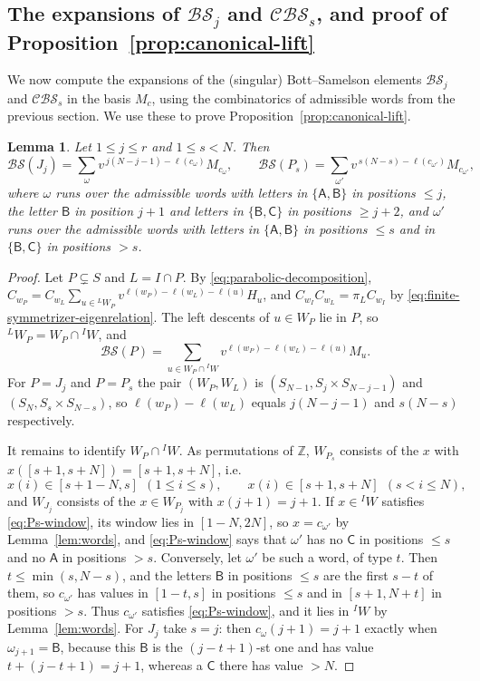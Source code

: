 \documentclass[11pt,a4paper,reqno]{amsart}
\numberwithin{equation}{section}
\newtheorem{lemma}[theorem]{Lemma}
\theoremstyle{definition}
\theoremstyle{remark}
\theoremstyle{plain}
\newcommand{\A}{\mathsf A}
\newcommand{\B}{\mathsf B}
\newcommand{\CC}{\mathsf C}
\newcommand{\D}{\mathcal {BS}}
\newcommand{\R}{\mathcal {BS}}
\newcommand{\V}{\mathcal {CBS}}
\begin{document}
\subsection{The expansions of $\R_j$ and $\V_s$, and proof of Proposition~\ref{prop:canonical-lift}}\label{sec:lowest-table}
 We now compute the expansions of the (singular) Bott--Samelson elements 
$\R_j$ and $\V_s$ in the basis $M_c$, using the combinatorics of admissible   words from the previous section. We   use these to prove Proposition~\ref{prop:canonical-lift}.
\begin{lemma}\label{lem:initial-supports}
Let $1\leq j\leq r$ and $1\leq s<N$. Then
\begin{equation}\label{eq:initial-expansions}
 \D(J_j)=\sum_{\omega}v^{\,j(N-j-1)-\ell(c_\omega)}M_{c_\omega},\qquad
 \D(P_s)=\sum_{\omega'}v^{\,s(N-s)-\ell(c_{\omega'})}M_{c_{\omega'}},
\end{equation}
where $\omega$ runs over the admissible words with letters in $\{\A,\B\}$ in positions $\leq j$, the letter $\B$ in
position $j+1$ and letters in $\{\B,\CC\}$ in positions $\geq j+2$, and $\omega'$ runs over the admissible words with
letters in $\{\A,\B\}$ in positions $\leq s$ and in $\{\B,\CC\}$ in positions $>s$.
\end{lemma}
\begin{proof}
Let $P\subsetneq S$ and $L=I\cap P$. By \eqref{eq:parabolic-decomposition}, $C_{w_P}=C_{w_L}\sum_{u\in{}^LW_P}v^{\ell(w_P)-\ell(w_L)-\ell(u)}H_u$,
and $C_{w_I}C_{w_L}=\pi_LC_{w_I}$ by \eqref{eq:finite-symmetrizer-eigenrelation}. The left descents of $u\in W_P$ lie in $P$,
so ${}^LW_P=W_P\cap{}^IW$, and
\begin{equation}\label{eq:BSP}
 \D(P)=\sum_{u\in W_P\cap{}^IW}v^{\ell(w_P)-\ell(w_L)-\ell(u)}M_u .
\end{equation}
For $P=J_j$ and $P=P_s$ the pair $(W_P,W_L)$ is $(S_{N-1},S_j\times S_{N-j-1})$ and $(S_N,S_s\times S_{N-s})$, so
$\ell(w_P)-\ell(w_L)$ equals $j(N-j-1)$ and $s(N-s)$ respectively.

It remains to identify $W_P\cap{}^IW$. As permutations of $\mathbb Z$, $W_{P_s}$ consists of the $x$ with $x([s+1,s+N])=[s+1,s+N]$, i.e.
\begin{equation}\label{eq:Ps-window}
 x(i)\in[s+1-N,s]\ \ (1\leq i\leq s),\qquad x(i)\in[s+1,s+N]\ \ (s<i\leq N),
\end{equation}
and $W_{J_j}$ consists of the $x\in W_{P_j}$ with $x(j+1)=j+1$.
If $x\in{}^IW$ satisfies \eqref{eq:Ps-window}, its window lies in $[1-N,2N]$, so $x=c_{\omega'}$ by
Lemma~\ref{lem:words}, and \eqref{eq:Ps-window} says that $\omega'$ has no $\CC$ in positions $\leq s$ and no $\A$ in
positions $>s$. Conversely, let $\omega'$ be such a word, of type $t$. Then $t\leq\min(s,N-s)$, and the letters $\B$
in positions $\leq s$ are the first $s-t$ of them, so $c_{\omega'}$ has values in $[1-t,s]$ in positions $\leq s$ and
in $[s+1,N+t]$ in positions $>s$. Thus $c_{\omega'}$ satisfies \eqref{eq:Ps-window}, and it lies in ${}^IW$ by
Lemma~\ref{lem:words}. For $J_j$ take $s=j$: then $c_\omega(j+1)=j+1$ exactly when $\omega_{j+1}=\B$, because this $\B$ is the
$(j-t+1)$-st one and has value $t+(j-t+1)=j+1$, whereas a $\CC$ there has value $>N$.
\end{proof}
\end{document}
